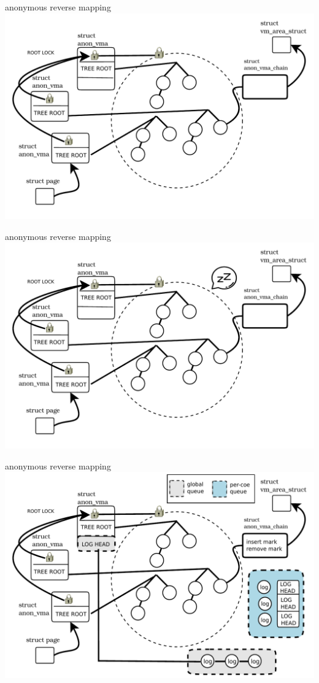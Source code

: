 \documentclass[english]{beamer} %
\begin{document}
\begin{frame}{anonymous reverse mapping}
\includegraphics[scale=0.5]{fig/anon_vma_default}
\end{frame}


\begin{frame}{anonymous reverse mapping}
\includegraphics[scale=0.5]{fig/anon_vma_default_1}
\end{frame}


\begin{frame}{anonymous reverse mapping}
\includegraphics[scale=0.5]{fig/anon_vma}
\end{frame}
\end{document}
